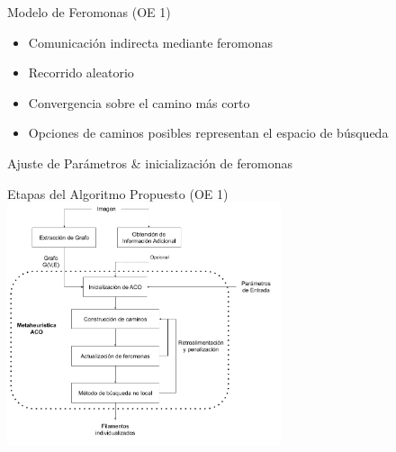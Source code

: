 \begin{frame}{Modelo de Feromonas (OE 1)}
\small
\begin{itemize}
    \item Comunicaci\'on indirecta mediante feromonas
    \item Recorrido aleatorio
    \item Convergencia sobre el camino m\'as corto
    \item Opciones de caminos posibles representan el espacio de b\'usqueda
\end{itemize}
    \begin{algorithm}[H]
    \SetAlgoLined
     Ajuste de Par\'ametros \& inicializaci\'on de feromonas\;
     \caption{Algoritmo metaheur\'istica ACO}\label{ACO-Algo}
    \end{algorithm}
\end{frame}


\begin{frame}{Etapas del Algoritmo Propuesto (OE 1)}
\centering  
\includegraphics[height=2.8in]{Pictures/ACOdiagram.png}
\end{frame}


